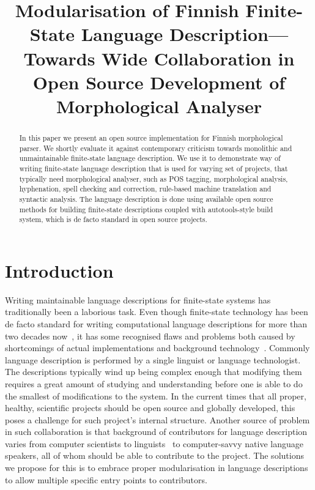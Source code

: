 \documentclass[postprint]{flammie}
\title{Modularisation of Finnish Finite-State Language Description---Towards
Wide Collaboration in Open Source Development of Morphological 
Analyser\footnotepubrights{Published originally in Nodalida 2011 in Rīga.
Official version may be at \url{http://dspace.utlib.ee/dspace/handle/10062/16955}.}}
\begin{document}
\maketitle
\begin{abstract}
In this paper we present an open source implementation for Finnish
morphological parser. We shortly evaluate it against contemporary criticism
towards monolithic and unmaintainable finite-state language description.  We
use it to demonstrate way of writing finite-state language description that is
used for varying set of projects, that typically need morphological analyser,
such as POS tagging, morphological analysis, hyphenation, spell checking and
correction, rule-based machine translation and syntactic analysis.  The
language description is done using available open source methods for building
finite-state descriptions coupled with autotools-style build system, which is
de facto standard in open source projects.
\end{abstract}

\section{Introduction}

Writing maintainable language descriptions for finite-state systems has
traditionally been a laborious task. Even though finite-state technology has
been de facto standard for writing computational language descriptions for more
than two decades now~\cite{beesley/2003}, it has some recognised flaws and
problems both caused by shortcomings of actual implementations and
background technology~\cite{wintner/2008}. Commonly language description is
performed by a single linguist or language technologist. The descriptions
typically wind up being complex enough that modifying them requires a great
amount of studying and understanding before one is able to do the smallest of
modifications to the system. In the current times that all proper, healthy,
scientific projects should be open source and globally developed, this poses a
challenge for such project's internal structure. Another source of problem in
such collaboration is that background of contributors for language description
varies from computer scientists to linguists~\cite{maxwell/2008} to
computer-savvy native language speakers, all of whom should be able to
contribute to the project.  The solutions we propose for this is to embrace
proper modularisation in language descriptions to allow multiple specific
entry points to contributors.
\end{document}
